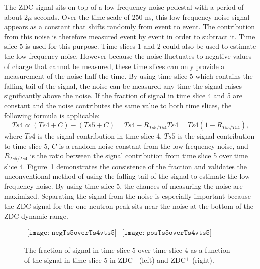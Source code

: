       The ZDC signal sits on top of a low frequency noise pedestal with a 
        period of about 2$\mu$ seconds. 
      Over the time scale of 250 ns, this low frequency noise signal appears
        as a constant that shifts randomly from event to event.
      The contribution from this noise is therefore measured event by event
        in order to subtract it.
      Time slice 5 is used for this purpose.
      Time slices 1 and 2 could also be used to estimate the low frequency 
        noise.
      However because the noise fluctuates to negative values of charge that 
        cannot be measured, these time slices can only provide a 
        measurement of the noise half the time. 
      By using time slice 5 which contains the falling tail of the signal, 
        the noise can be measured any time the signal raises significantly 
        above the noise.
      If the fraction of signal in time slice 4 and 5 are constant and
        the noise contributes the same value to both time slices, the 
        following formula is applicable:
      \begin{equation}
        Ts4 \propto (Ts4 + C) - ( Ts5 + C ) = Ts4 - R_{Ts5/Ts4}Ts4 
        = Ts4(1-R_{Ts5/Ts4}),
        \label{eq:ts4ish}
      \end{equation}
      where $Ts4$ is the signal contribution in time slice 4, $Ts5$ is the 
        signal contribution to time slice 5, $C$ is a random noise constant
        from the low frequency noise, and $R_{Ts5/Ts4}$ is the ratio between
        the signal contribution from time slice 5 over time slice 4.
      Figure~\ref{fig:zdcTs4OvTs5VTs5} demonstrates the consistence of the 
        fraction and validates the unconventional method of using the falling 
        tail of the signal to estimate the low frequency noise. 
      By using time slice 5, the chances of measuring the noise are maximized. 
      Separating the signal from the noise is especially important because
        the ZDC signal for the one neutron peak sits near the noise at the 
        bottom of the ZDC dynamic range.
      \begin{figure}[!Hhbt]
        \centering
        $ \begin{array}{cc}
          \texttt{[image: negTs5overTs4vts5]} &
          \texttt{[image: posTs5overTs4vts5]}
        \end{array} $  
        \caption{ The fraction of signal in time slice 5 over time slice 4 
          as a function of the signal in time slice 5 in ZDC$^{-}$ (left) and 
          ZDC$^{+}$ (right).}
        \label{fig:zdcTs4OvTs5VTs5}
      \end{figure}
      
